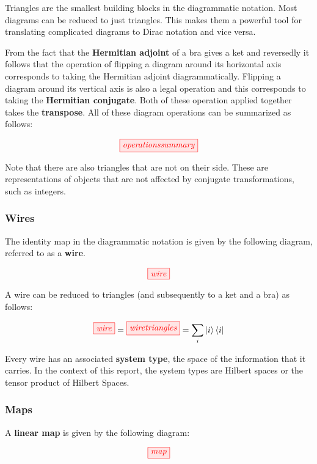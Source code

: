 \documentclass[]{article}
\begin{document}
Triangles are the smallest building blocks in the diagrammatic notation. Most diagrams can be reduced to just triangles. This makes them a powerful tool for translating complicated diagrams to Dirac notation and vice versa.

From the fact that the \textbf{Hermitian adjoint} of a bra gives a ket and reversedly it follows that the operation of flipping a diagram around its horizontal axis corresponds to taking the Hermitian adjoint diagrammatically. Flipping a diagram around its vertical axis is also a legal operation and this corresponds to taking the \textbf{Hermitian conjugate}. Both of these operation applied together takes the \textbf{transpose}. All of these diagram operations can be summarized as follows:

\begin{equation}
\tikzfig{operationssummary}
\end{equation}

Note that there are also triangles that are not on their side. These are representations of objects that are not affected by conjugate transformations, such as integers.
\subsubsection{Wires}
\label{identity}
The identity map in the diagrammatic notation is given by the following diagram, referred to as a \textbf{wire}.

\begin{equation}
\tikzfig{wire}
\end{equation}

A wire can be reduced to triangles (and subsequently to a ket and a bra) as follows: 

\begin{equation}
\tikzfig{wire} = \tikzfig{wiretriangles} = \sum_{i}\ket{i}\bra{i}
\end{equation}

Every wire has an associated \textbf{system type}, the space of the information that it carries. In the context of this report, the system types are Hilbert spaces or the tensor product of Hilbert Spaces. 

\subsubsection{Maps}
\label{maps}

A \textbf{linear map} is given by the following diagram:

\begin{equation}
\tikzfig{map}
\end{equation}
\end{document}
